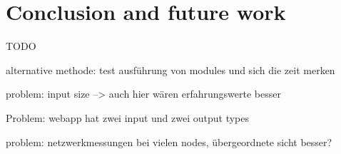 \chapter{Conclusion and future work}

TODO

alternative methode: test ausführung von modules und sich die zeit merken

problem: input size --> auch hier wären erfahrungswerte besser

Problem: webapp hat zwei input und zwei output types

problem: netzwerkmessungen bei vielen nodes, übergeordnete sicht besser?